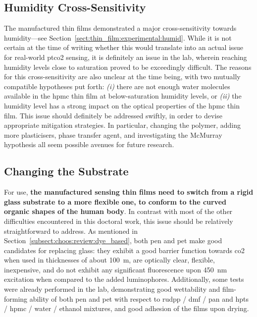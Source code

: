 \subsection{Humidity Cross-Sensitivity}\label{sect:conclusion:humidity}

The manufactured thin films demonstrated a major cross-sensitivity towards humidity---see Section~\ref{sect:thin_film:experimental:humid}. While it is not certain at the time of writing whether this would translate into an actual issue for real-world \gls{ptco2} sensing, it is definitely an issue in the lab, wherein reaching humidity levels close to saturation proved to be exceedingly difficult. The reasons for this cross-sensitivity are also unclear at the time being, with two mutually compatible hypotheses put forth: \textit{(i)} there are not enough water molecules available in the \gls{hpmc} thin film at below-saturation humidity levels, or \textit{(ii)} the humidity level has a strong impact on the optical properties of the \gls{hpmc} thin film. This issue should definitely be addressed swiftly, in order to devise appropriate mitigation strategies. In particular, changing the polymer, adding more plasticisers, phase transfer agent, and investigating the McMurray hypothesis all seem possible avenues for future research.

\subsection{Changing the Substrate}\label{sect:conclusion:substrate}

For \invivo{} use, \textbf{the manufactured sensing thin films need to switch from a rigid glass substrate to a more flexible one, to conform to the curved organic shapes of the human body}. In contrast with most of the other difficulties encountered in this doctoral work, this issue should be relatively straightforward to address. As mentioned in Section~\ref{subsect:choos:review:dye_based}, both \gls{pen} and \gls{pet} make good candidates for replacing glass: they exhibit a good barrier function towards \gls{co2} when used in thicknesses of about 100~\textmu{}m, are optically clear, flexible, inexpensive, and do not exhibit any significant fluorescence upon 450~nm excitation when compared to the added luminophores\cite{ouchi2007}. Additionally, some tests were already performed in the lab, demonstrating good wettability and film-forming ability of both \gls{pen} and \gls{pet} with respect to \gls{rudpp} / \gls{dmf} / \gls{pan} and \gls{hpts} / \gls{hpmc} / water / ethanol mixtures, and good adhesion of the films upon drying.

